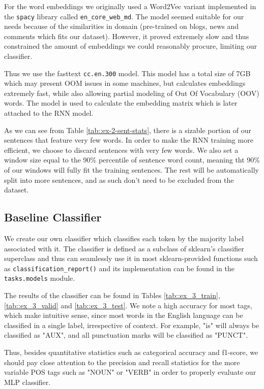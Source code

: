 \documentclass[10pt, a4paper]{article}
\begin{document}
	For the word embeddings we originally used a Word2Vec variant implemented in the \texttt{spacy} library called \texttt{en\_core\_web\_md}. The model seemed suitable for our needs because of the similarities in domain (pre-trained on blogs, news and comments which fits our dataset). However, it proved extremely slow and thus constrained the amount of embeddings we could reasonably procure, limiting our classifier.
	
	Thus we use the fasttext \texttt{cc.en.300} model. This model has a total size of 7GB which may present OOM issues in some machines, but calculates embeddings extremely fast, while also allowing partial modeling of Out Of Vocabulary (OOV) words. The model is used to calculate the embedding matrix which is later attached to the RNN model.
	
	As we can see from Table \ref{tab::ex-2-sent-stats}, there is a sizable portion of our sentences that feature very few words. In order to make the RNN training more efficient, we choose to discard sentences with very few words. We also set a window size equal to the 90\% percentile of sentence word count, meaning tht 90\% of our windows will fully fit the training sentences. The rest will be automatically split into more sentences, and as such don't need to be excluded from the dataset.
	
	
	\subsection{Baseline Classifier}
	
	We create our own classifier which classifies each token by the majority label associated with it. The classifier is defined as a subclass of sklearn's classifier superclass and thus can seamlessly use it in most sklearn-provided functions such as \texttt{classification\_report()} and its implementation can be found in the \texttt{tasks.models} module.
	
	The results of the classifier can be found in Tables \ref{tab::ex_3_train}, \ref{tab::ex_3_valid} and \ref{tab::ex_3_test}. We note a high accuracy for most tags, which make intuitive sense, since most words in the English language can be classified in a single label, irrespective of context. For example, "is" will always be classified as "AUX", and all punctuation marks will be classified as "PUNCT".
	
	Thus, besides quantitative statistics such as categorical accuracy and f1-score, we should pay close attention to the precision and recall statistics for the more variable POS tags such as "NOUN" or "VERB" in order to properly evaluate our MLP classifier.
	
\end{document}
